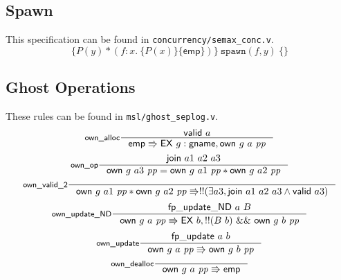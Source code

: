 \documentclass[11pt]{article}
\begin{document}
\subsection{Spawn}
This specification can be found in \texttt{concurrency/semax\_conc.v}.
$$\{P(y) * (f : x.\ \{P(x)\}\{\mathsf{emp}\})\}\ \texttt{spawn}(f, y)\ \{\}$$

\subsection{Ghost Operations}
These rules can be found in \texttt{msl/ghost\_seplog.v}.
$$\inference[\textsf{own\_alloc}]{\mathsf{valid}\ a}{\mathsf{emp} \Rrightarrow \mathsf{EX}\ g : \mathsf{gname}, \mathsf{own}\ g\ a\ \mathit{pp}}$$
$$\inference[\textsf{own\_op}]{\mathsf{join}\ a1\ a2\ a3}{\mathsf{own}\ g\ a3\ \mathit{pp} = \mathsf{own}\ g\ a1\ \mathit{pp} * \mathsf{own}\ g\ a2\ \mathit{pp}}$$
$$\inference[\textsf{own\_valid\_2}]{}{\mathsf{own}\ g\ a1\ \mathit{pp} * \mathsf{own}\ g\ a2\ \mathit{pp} \Rrightarrow !!(\exists a3, \mathsf{join}\ a1\ a2\ a3 \land \mathsf{valid}\ a3)}$$
$$\inference[\textsf{own\_update\_ND}]{\mathsf{fp\_update\_ND}\ a\ B}{\mathsf{own}\ g\ a\ \mathit{pp} \Rrightarrow \mathsf{EX}\ b, !!(B\ b)\ \&\&\ \mathsf{own}\ g\ b\ \mathit{pp}}$$
$$\inference[\textsf{own\_update}]{\mathsf{fp\_update}\ a\ b}{\mathsf{own}\ g\ a\ \mathit{pp} \Rrightarrow \mathsf{own}\ g\ b\ \mathit{pp}}$$
$$\inference[\textsf{own\_dealloc}]{}{\mathsf{own}\ g\ a\ \mathit{pp} \Rrightarrow \mathsf{emp}}$$
\end{document}
